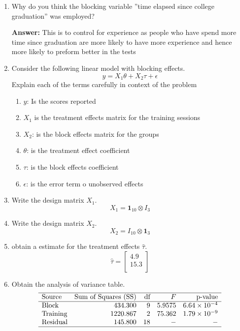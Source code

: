 \documentclass{article}
\begin{document}
\begin{enumerate}
	\item Why do you think the blocking variable ”time elapsed since college graduation” was employed?

	      \textbf{Answer:} This is to control for experience as people who have spend more time since graduation
	      are more likely to have more experience and hence more likely to preform better in the tests
	\item Consider the following linear model with blocking effects.
	      $$
		      y= X_1 \theta + X_2 \tau + \epsilon
	      $$
	      Explain each of the terms carefully in context of the problem
	      \begin{enumerate}
		      \item $y$: Is the scores reported
		      \item $X_1$ is the treatment effects matrix for the training sessions
		      \item $X_2$: is the block effects matrix for the groups
		      \item $\theta$: is the treatment effect coefficient
		      \item $\tau$: is the block effects coefficient
		      \item $\epsilon$: is the error term o unobserved effects
	      \end{enumerate}
	\item Write the design matrix $X_1$.
	      $$
		      X_1 =\mathbf{1}_{10} \otimes I_3
	      $$

	\item Write the design matrix $X_2$.
	      $$
		      X_2 = I_{10} \otimes \mathbf{1}_3
	      $$
	\item obtain a estimate for the treatment effects $\hat{\tau}$.
	      $$
		      \hat{\tau} = \begin{bmatrix}
			      4.9  \\
			      15.3 \\
		      \end{bmatrix}
	      $$

	\item Obtain the analysis of variance table.
	      \[
		      \begin{array}{lrrrr}
			      \hline
			      \text{Source}   & \text{Sum of Squares (SS)} & \text{df} & F      & \text{p-value}      \\
			      \hline
			      \text{Block}    & 434.300                    & 9         & 5.9575 & 6.64 \times 10^{-4} \\
			      \text{Training} & 1220.867                   & 2         & 75.362 & 1.79 \times 10^{-9} \\
			      \text{Residual} & 145.800                    & 18        & -      & -                   \\
			      \hline
		      \end{array}
	      \]


\end{enumerate}
\end{document}
